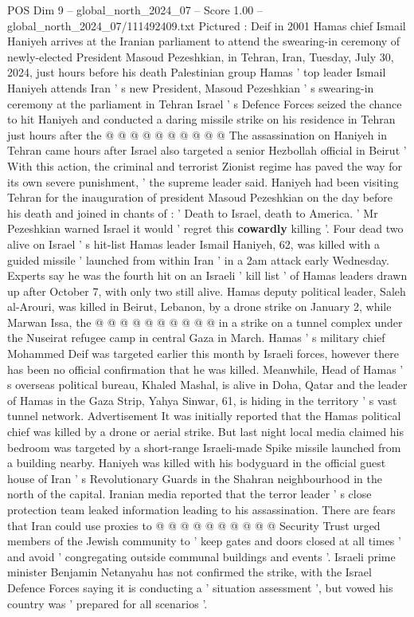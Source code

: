 \begin{textsample}{POS Dim 9 – global\_north\_2024\_07 – Score 1.00 – global\_north\_2024\_07/111492409.txt}
Pictured : Deif in 2001 Hamas chief Ismail Haniyeh arrives at the Iranian parliament to attend the swearing-in ceremony of newly-elected President Masoud Pezeshkian, in Tehran, Iran, Tuesday, July 30, 2024, just hours before his death Palestinian group Hamas ' top leader Ismail Haniyeh attends Iran ' s new President, Masoud Pezeshkian ' s swearing-in ceremony at the parliament in Tehran Israel ' s Defence Forces seized the chance to hit Haniyeh and conducted a daring missile strike on his residence in Tehran just hours after the @ @ @ @ @ @ @ @ @ @ The assassination on Haniyeh in Tehran came hours after Israel also targeted a senior Hezbollah official in Beirut ' With this action, the criminal and terrorist Zionist regime has paved the way for its own severe punishment, ' the supreme leader said.
Haniyeh had been visiting Tehran for the inauguration of president Masoud Pezeshkian on the day before his death and joined in chants of : ' Death to Israel, death to America. ' Mr Pezeshkian warned Israel it would ' regret this \textbf{cowardly} killing '.
Four dead two alive on Israel ' s hit-list Hamas leader Ismail Haniyeh, 62, was killed with a guided missile ' launched from within Iran ' in a 2am attack early Wednesday.
Experts say he was the fourth hit on an Israeli ' kill list ' of Hamas leaders drawn up after October 7, with only two still alive.
Hamas deputy political leader, Saleh al-Arouri, was killed in Beirut, Lebanon, by a drone strike on January 2, while Marwan Issa, the @ @ @ @ @ @ @ @ @ @ in a strike on a tunnel complex under the Nuseirat refugee camp in central Gaza in March.
Hamas ' s military chief Mohammed Deif was targeted earlier this month by Israeli forces, however there has been no official confirmation that he was killed.
Meanwhile, Head of Hamas ' s overseas political bureau, Khaled Mashal, is alive in Doha, Qatar and the leader of Hamas in the Gaza Strip, Yahya Sinwar, 61, is hiding in the territory ' s vast tunnel network.
Advertisement It was initially reported that the Hamas political chief was killed by a drone or aerial strike.
But last night local media claimed his bedroom was targeted by a short-range Israeli-made Spike missile launched from a building nearby.
Haniyeh was killed with his bodyguard in the official guest house of Iran ' s Revolutionary Guards in the Shahran neighbourhood in the north of the capital.
Iranian media reported that the terror leader ' s close protection team leaked information leading to his assassination.
There are fears that Iran could use proxies to @ @ @ @ @ @ @ @ @ @ Security Trust urged members of the Jewish community to ' keep gates and doors closed at all times ' and avoid ' congregating outside communal buildings and events '.
Israeli prime minister Benjamin Netanyahu has not confirmed the strike, with the Israel Defence Forces saying it is conducting a ' situation assessment ', but vowed his country was ' prepared for all scenarios '.

\end{textsample}
